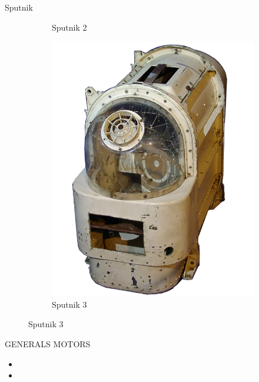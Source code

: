 \begin{frame}[fragile]{ Sputnik}
\begin{figure}
\begin{subfigure}{0.33\textwidth}
			\caption{Sputnik 2 }
		\end{subfigure}
		\pause
		\begin{subfigure}{0.32\textwidth}
			\centering
			\includegraphics[scale=0.4]{./EtapaPrimeriza/imagenes/s10.jpg}
			\caption{Sputnik 3 }
		\end{subfigure}
	\end{figure}
\end{frame}


\begin{frame}[fragile]{ GENERALS MOTORS      }
\vspace{8px}
\pause
{}
\begin{block}{}
	\begin{itemize}
		\item 
		\pause
		\item 
	\end{itemize}
\end{block}
\end{frame}
